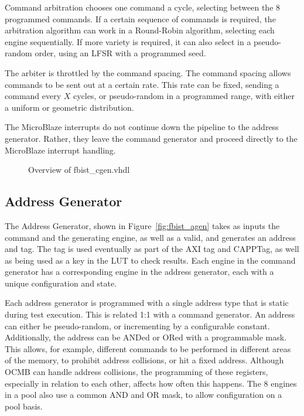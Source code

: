Command arbitration chooses one command a cycle, selecting between the
8 programmed commands. If a certain sequence of commands is required,
the arbitration algorithm can work in a Round-Robin algorithm,
selecting each engine sequentially. If more variety is required, it
can also select in a pseudo-random order, using an LFSR with a
programmed seed.

The arbiter is throttled by the command spacing. The command spacing
allows commands to be sent out at a certain rate. This rate can be
fixed, sending a command every $X$ cycles, or pseudo-random in a
programmed range, with either a uniform or geometric distribution.

The MicroBlaze interrupts do not continue down the pipeline to the
address generator. Rather, they leave the command generator and
proceed directly to the MicroBlaze interrupt handling.

\begin{figure}[h]
  \begin{center}
    
  \end{center}
  \caption[Overview of fbist\_cgen.vhdl]{\label{fig:fbist_cgen}Overview of fbist\_cgen.vhdl
  }
\end{figure}

\subsection{Address Generator}
The Address Generator, shown in Figure~\ref{fig:fbist_agen} takes as
inputs the command and the generating engine, as well as a valid, and
generates an address and tag. The tag is used eventually as part of
the AXI tag and CAPPTag, as well as being used as a key in the LUT to
check results. Each engine in the command generator has a
corresponding engine in the address generator, each with a unique
configuration and state.

Each address generator is programmed with a single address type that
is static during test execution. This is related 1:1 with a command
generator. An address can either be pseudo-random, or incrementing by
a configurable constant. Additionally, the address can be ANDed or
ORed with a programmable mask. This allows, for example, different
commands to be performed in different areas of the memory, to prohibit
address collisions, or hit a fixed address. Although OCMB can handle
address collisions, the programming of these registers, especially in
relation to each other, affects how often this happens. The 8 engines
in a pool also use a common AND and OR mask, to allow configuration on
a pool basis.

